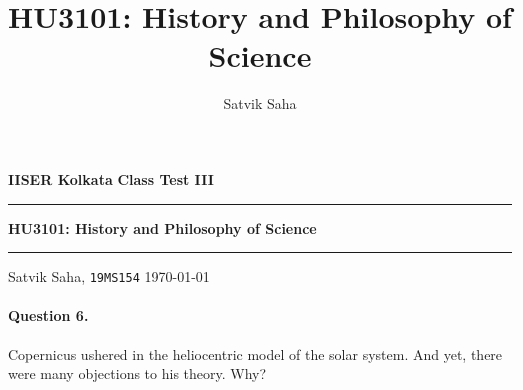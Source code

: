 \documentclass[11pt]{article}
\title{HU3101: History and Philosophy of Science}
\author{Satvik Saha}
\date{}
\theoremstyle{remark}
\begin{document}
    \noindent\textbf{IISER Kolkata} \hfill \textbf{Class Test III}
    \vspace{3pt}
    \hrule
    \vspace{3pt}
    \begin{center}
    \LARGE{\textbf{HU3101: History and Philosophy of Science}}
    \end{center}
    \vspace{3pt}
    \hrule
    \vspace{3pt}
    Satvik Saha, \texttt{19MS154} \hfill \today
    \vspace{20pt}

    \paragraph{Question 6.} Copernicus ushered in the heliocentric model of the solar
    system. And yet, there were many objections to his theory. Why?
\end{document}
